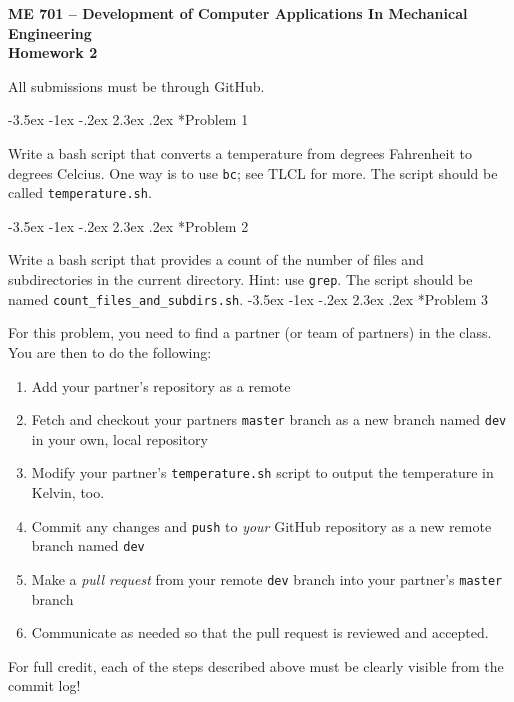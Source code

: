 \documentclass[11pt]{article}
\makeatletter
\renewcommand\section{\@startsection{section}{1}{\z@}%
                                  {-3.5ex \@plus -1ex \@minus -.2ex}%
                                  {2.3ex \@plus.2ex}%
                                  {\normalfont\bfseries}}
\makeatother
\begin{document}
{\large
  \begin{center}
    {\bf ME 701 -- Development of Computer Applications In Mechanical Engineering \\ 
         Homework 2 }         
  \end{center}
}
 
All submissions must be through GitHub.


\section*{Problem 1}

Write a bash script that converts a temperature from degrees Fahrenheit to degrees Celcius. 
One way is to use {\tt bc}; see TLCL for more.  
The script should be called {\tt temperature.sh}.

\section*{Problem 2}
 
Write a bash script that provides a count of the number of files and subdirectories in the current directory. 
Hint: use {\tt grep}.
The script should be named {\tt count\_files\_and\_subdirs.sh}.
\section*{Problem 3}

For this problem, you need to find a partner (or team of partners) in the class.  
You are then to do the following:
\begin{enumerate}
 \item Add your partner's repository as a remote
 \item Fetch and checkout your partners {\tt master} branch as a new branch named {\tt dev} in your own, local repository
 \item Modify your partner's {\tt  temperature.sh} script to output the temperature in Kelvin, too.
 \item Commit any changes and {\tt push} to {\it your} GitHub repository as a new remote branch named {\tt dev}
 \item Make a {\it pull request} from your remote {\tt dev} branch into your partner's {\tt master} branch
 \item Communicate as needed so that the pull request is reviewed and accepted.
\end{enumerate}
For full credit, each of the steps described above must be clearly visible from the commit log!
\end{document}
